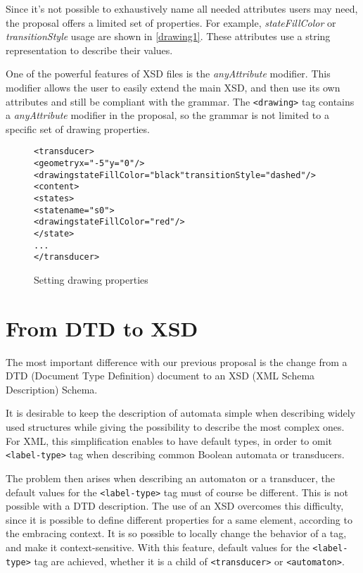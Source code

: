 \documentclass[a4paper]{article}
\newcommand{\xtag}[1]{\texttt{<#1>}}
\def\typetag{\xtag{label-type}}
\def\drawingtag{\xtag{drawing}}
\def\automatontag{\xtag{automaton}}
\def\transducertag{\xtag{transducer}}
\begin{document}
Since it's not possible to exhaustively name all needed attributes
users may need, the proposal offers a limited set of properties. For
example, \textit{stateFillColor} or \textit{transitionStyle} usage are
shown in \autoref{drawing1}. These attributes use a string
representation to describe their values.

One of the powerful features of XSD files is the \textit{anyAttribute}
modifier. This modifier allows the user to easily extend the main XSD,
and then use its own attributes and still be compliant with the
grammar. The \drawingtag{} tag contains a \textit{anyAttribute}
modifier in the proposal, so the grammar is not limited to a specific
set of drawing properties.

\begin{figure}[ht]
  \small
  \begin{center}
\begin{alltt}
<transducer>
  <geometry x="-5" y="0"/>
  <drawing stateFillColor="black" transitionStyle="dashed"/>
  <content>
     <states>
        <state name="s0">
            <drawing stateFillColor="red"/>
        </state>
      ...
</transducer>
\end{alltt}

\caption{Setting drawing properties}
\label{drawing1}
  \end{center}
\end{figure}


\section{From DTD to XSD}
The most important difference with our previous proposal
\cite{VXML04} is the change from a DTD (Document Type Definition)
document to an XSD (XML Schema Description) Schema.

It is desirable to keep the description of automata simple when
describing widely used structures while giving the possibility to
describe the most complex ones. For XML, this simplification enables
to have default types, in order to omit \typetag{} tag when describing
common Boolean automata or transducers.

The problem then arises when describing an automaton or a transducer,
the default values for the \typetag{} tag must of course be different.
This is not possible with a DTD description.  The use of an XSD
overcomes this difficulty, since it is possible to define different
properties for a same element, according to the embracing context. It
is so possible to locally change the behavior of a tag, and make it
context-sensitive. With this feature, default values for the
\typetag{} tag are achieved, whether it is a child of
\transducertag{} or \automatontag{}.
\end{document}
